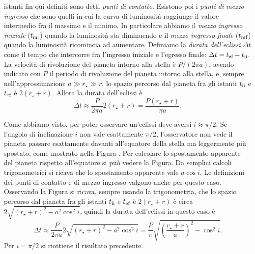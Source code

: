 istanti fin qui definiti sono detti \emph{punti di contatto}. Esistono poi i
\emph{punti di mezzo ingresso} che sono quelli in cui la curva di luminosità
raggiunge il valore intermedio fra il massimo e il minimo. In particolare
abbiamo il \emph{mezzo ingresso iniziale} ($t_{\textup{mi}}$) quando la
luminosità sta diminuendo e il \emph{mezzo ingresso finale} ($t_{\textup{mf}}$)
quando la luminosità ricomincia ad aumentare. Definiamo la
\emph{durata dell'eclissi} $\Delta t$ come il tempo che intercorre fra
l'ingresso iniziale e l'egresso finale:
$\Delta t = t_{\textup{ef}} - t_{\textup{ii}}$. La velocità di rivoluzione del
pianeta intorno alla stella è $P/(2\pi a)$, avendo indicato con $P$ il periodo
di rivoluzione del pianeta intorno alla stella, e, sempre nell'approssimazione
$a \gg r_\star \gg r$, lo spazio percorso dal pianeta fra gli istanti
$t_{\textup{ii}}$ e $t_{\textup{ef}}$ è $2(r_\star + r)$. Allora la durata
dell'eclissi è
\begin{equation}
  \Delta t \approx \frac{P}{2\pi a}2(r_\star + r) = \frac{P(r_\star + r)}{\pi
    a}.
\end{equation}

Come abbiamo visto, per poter osservare un'eclissi deve aversi $i \approx
\pi/2$. Se l'angolo di inclinazione $i$ non vale esattamente $\pi/2$,
l'osservatore non vede il pianeta passare esattamente davanti all'equatore della
stella ma leggermente più spostato, come mostrato nella Figura %
. Per calcolare lo spostamento apparente del pianeta rispetto all'equatore si
può vedere la Figura. %
Da semplici calcoli trigonometrici si ricava che lo spostamento apparente vale
$a \cos i$. Le definizioni dei punti di contatto e di mezzo ingresso valgono
anche per questo caso. Osservando la Figura %
si ricava, sempre usando la trigonometria, che lo spazio percorso dal pianeta
fra gli istanti $t_{\textup{ii}}$ e $t_{\textup{ef}}$ è $2(r_\star + r)$ è circa
$2\sqrt{(r_\star + r)^2 - a^2\cos^2 i}$, quindi la durata dell'eclissi in questo
caso è
\begin{equation}
  \Delta t \approx \frac{P}{2\pi a} 2\sqrt{(r_\star + r)^2 - a^2\cos^2 i} =
  \frac{P}{\pi} \sqrt{\left(\frac{r_\star + r}{a}\right)^2 - \cos^2 i}.
\end{equation}
Per $i = \pi/2$ si riottiene il risultato precedente.

